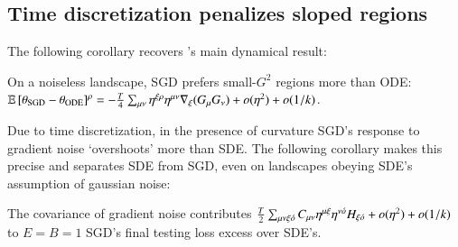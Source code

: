         \subsection{Time discretization penalizes sloped regions}
            The following corollary recovers \cite{ba21}'s main dynamical
            result: 
            \begin{cor}[$\sdia{c(0-1-2)(01-12)}$] \label{cor:epochs}
                On a noiseless landscape, SGD prefers small-$G^2$ regions
                more than ODE: 
                $
                    \mathbb{E}\left[\theta_{\text{SGD}} - \theta_{\text{ODE}}\right]^\rho
                        =
                    -\frac{T}{4}
                    \sum_{\mu\nu} \eta^{\xi\rho} \eta^{\mu\nu} \nabla_\xi(G_\mu G_\nu)
                    + o(\eta^2) + o(1/k) 
                $.
            \end{cor}
            Due to time discretization, in the presence of curvature SGD's
            response to gradient noise `overshoots' more than SDE.  The
            following corollary makes this precise and separates SDE from SGD,
            even on landscapes obeying SDE's assumption of gaussian noise:
            \begin{cor}[$\sdia{c(01-2)(02-12)}$] \label{cor:vsode}
                The covariance of gradient noise contributes  
                $
                    \frac{T}{2} \sum_{\mu\nu\xi{\acute{o}}} C_{\mu\nu} \eta^{\mu\xi}\eta^{\nu{\acute{o}}}
                    H_{\xi{\acute{o}}} + o(\eta^2) + o(1/k) 
                $  
                to $E=B=1$ SGD's final testing loss excess over SDE's.
            \end{cor}

